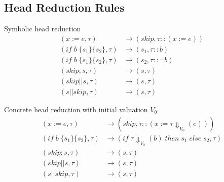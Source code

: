 \documentclass[submission,copyright,creativecommons]{eptcs}
\begin{document}
\subsection{Head Reduction Rules}
\noindent\begin{minipage}[t]{.5\linewidth}
\centering
Symbolic head reduction
\begin{align*}
  (x := e, \tau) & \rightarrow (skip, \tau :: (x := e)) \\
  (if \;b\; \{s_{1}\} \{s_{2}\}, \tau) & \rightarrow (s_{1}, \tau :: b) \\
  (if \;b\; \{s_{1}\} \{s_{2}\}, \tau) & \rightarrow (s_{2}, \tau :: \neg b) \\
  (skip ; s, \tau) & \rightarrow (s, \tau) \\
  (skip |\!| s, \tau) & \rightarrow (s, \tau) \\
  (s |\!| skip, \tau) & \rightarrow (s, \tau)
\end{align*}
\end{minipage}\hfill
\begin{minipage}[t]{.5\linewidth}
\centering
Concrete head reduction with initial valuation $V_{0}$
\begin{align*}
  (x := e, \tau) & \rightarrow (skip, \tau :: (x := \tau \Downarrow_{V_{0}} (e))) \\
  (if \;b\; \{s_{1}\} \{s_{2}\}, \tau) & \rightarrow (if \; \tau \Downarrow_{V_{0}} (b) \; then \; s_{1} \; else \; s_{2}, \tau) \\
  (skip ; s, \tau) & \rightarrow (s, \tau) \\
  (skip |\!| s, \tau) & \rightarrow (s, \tau) \\
  (s |\!| skip, \tau) & \rightarrow (s, \tau)
\end{align*}
\end{minipage}
\end{document}
